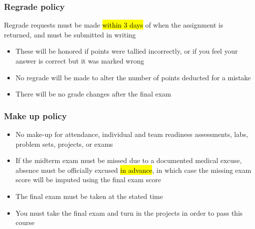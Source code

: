 \documentclass[slidestop,compress,mathserif,12pt,t,professionalfonts,xcolor=table]{beamer}
\begin{document}

\begin{frame}
\frametitle{Regrade policy}

Regrade requests must be made \hl{within 3 days} of when the assignment is returned, and must be submitted in writing 

\begin{itemize}

\item These will be honored if points were tallied incorrectly, or if you feel your answer is correct but it was marked wrong

\item No regrade will be made to alter the number of points deducted for a mistake

\item There will be no grade changes after the final exam

\end{itemize}

\end{frame}


\begin{frame}
\frametitle{Make up policy}

\begin{itemize}

\item No make-up for attendance, individual and team readiness assessments, labs, problem sets, projects, or exams

\item If the midterm exam must be missed due to a documented medical excuse, absence must be officially excused \hl{in advance}, in which case the missing exam score will be imputed using the final exam score

\item The final exam must be taken at the stated time

\item You must take the final exam and turn in the projects in order to pass this course

\end{itemize}

\end{frame}

\end{document}

